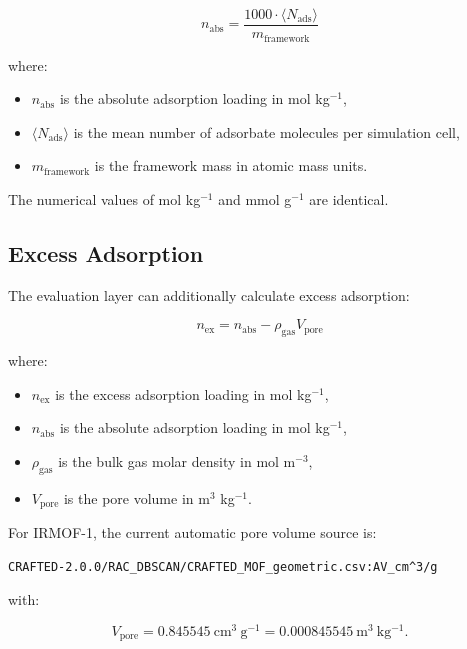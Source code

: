 \documentclass[11pt,a4paper]{article}
\begin{document}
\begin{equation}
    n_{\mathrm{abs}} =
    \frac{1000 \cdot \langle N_{\mathrm{ads}}\rangle}{m_{\mathrm{framework}}}
\end{equation}

where:

\begin{itemize}
    \item $n_{\mathrm{abs}}$ is the absolute adsorption loading in mol kg$^{-1}$,
    \item $\langle N_{\mathrm{ads}}\rangle$ is the mean number of adsorbate molecules per simulation cell,
    \item $m_{\mathrm{framework}}$ is the framework mass in atomic mass units.
\end{itemize}

The numerical values of mol kg$^{-1}$ and mmol g$^{-1}$ are identical.

\subsection{Excess Adsorption}

The evaluation layer can additionally calculate excess adsorption:

\begin{equation}
    n_{\mathrm{ex}} =
    n_{\mathrm{abs}} - \rho_{\mathrm{gas}} V_{\mathrm{pore}}
\end{equation}

where:

\begin{itemize}
    \item $n_{\mathrm{ex}}$ is the excess adsorption loading in mol kg$^{-1}$,
    \item $n_{\mathrm{abs}}$ is the absolute adsorption loading in mol kg$^{-1}$,
    \item $\rho_{\mathrm{gas}}$ is the bulk gas molar density in mol m$^{-3}$,
    \item $V_{\mathrm{pore}}$ is the pore volume in m$^3$ kg$^{-1}$.
\end{itemize}

For IRMOF-1, the current automatic pore volume source is:

\begin{lstlisting}
CRAFTED-2.0.0/RAC_DBSCAN/CRAFTED_MOF_geometric.csv:AV_cm^3/g
\end{lstlisting}

with:

\begin{equation}
    V_{\mathrm{pore}} = 0.845545~\mathrm{cm^3~g^{-1}}
    = 0.000845545~\mathrm{m^3~kg^{-1}}.
\end{equation}
\end{document}

